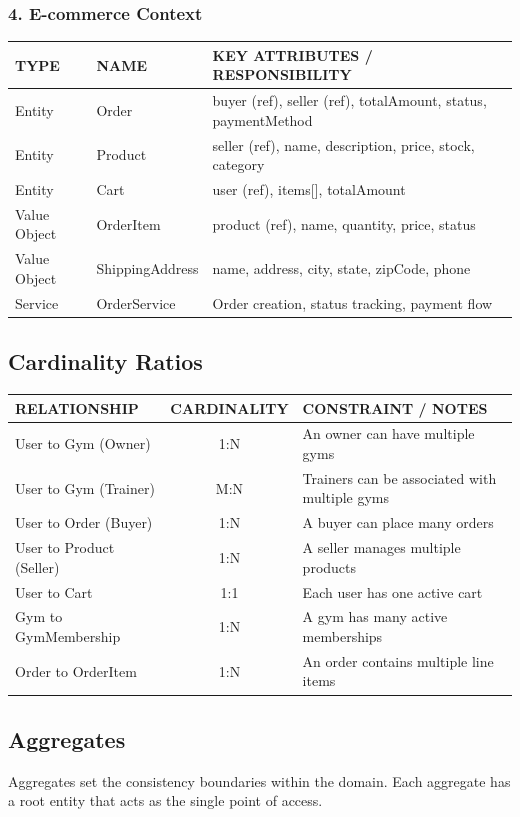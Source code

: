 \documentclass[11pt,a4paper]{article}
\begin{document}
\subsubsection*{4. E-commerce Context}
\noindent
\begin{tabularx}{\textwidth}{l l X}
\toprule
\textbf{TYPE} & \textbf{NAME} & \textbf{KEY ATTRIBUTES / RESPONSIBILITY} \\
\midrule
Entity & Order & buyer (ref), seller (ref), totalAmount, status, paymentMethod \\
Entity & Product & seller (ref), name, description, price, stock, category \\
Entity & Cart & user (ref), items[], totalAmount \\
Value Object & OrderItem & product (ref), name, quantity, price, status \\
Value Object & ShippingAddress & name, address, city, state, zipCode, phone \\
Service & OrderService & Order creation, status tracking, payment flow \\
\bottomrule
\end{tabularx}

\subsection{Cardinality Ratios}

\vspace{1em}
\noindent
\begin{tabularx}{\textwidth}{l c X}
\toprule
\textbf{RELATIONSHIP} & \textbf{CARDINALITY} & \textbf{CONSTRAINT / NOTES} \\
\midrule
User to Gym (Owner) & 1:N & An owner can have multiple gyms \\
User to Gym (Trainer) & M:N & Trainers can be associated with multiple gyms \\
User to Order (Buyer) & 1:N & A buyer can place many orders \\
User to Product (Seller) & 1:N & A seller manages multiple products \\
User to Cart & 1:1 & Each user has one active cart \\
Gym to GymMembership & 1:N & A gym has many active memberships \\
Order to OrderItem & 1:N & An order contains multiple line items \\
\bottomrule
\end{tabularx}

\subsection{Aggregates}
Aggregates set the consistency boundaries within the domain. Each aggregate has a root entity that acts as the single point of access.
\end{document}
